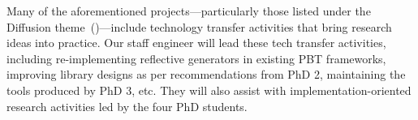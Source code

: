 


\smallskip{}
%
Many of the aforementioned projects---particularly those listed under
the Diffusion theme~()---include technology
transfer activities that bring research ideas into practice. Our staff
engineer will lead these tech transfer activities, including
re-implementing reflective generators in existing PBT frameworks,
improving library designs as per recommendations from PhD 2,
maintaining the tools produced by PhD 3, etc.  They will also assist
with implementation-oriented research activities led by the four PhD
students.


